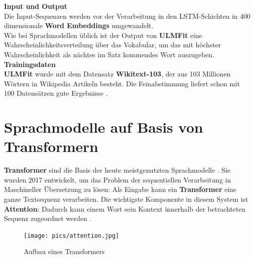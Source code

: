 \textbf{Input und Output}\\
Die Input-Sequenzen werden vor der Verarbeitung in den LSTM-Schichten in 400 dimensionale \textbf{Word Embeddings} umgewandelt.\\
Wie bei Sprachmodellen \"ublich ist der Output von \textbf{ULMFit} eine Wahrscheinlichkeitsverteilung \"uber das Vokabular, um das mit h\"ochster Wahrscheinlichkeit als n\"achtes im Satz kommendes Wort auszugeben.\\

\textbf{Trainingsdaten}\\
\textbf{ULMFit} wurde mit dem Datensatz \textbf{Wikitext-103}, der aus 103 Millionen W\"ortern in Wikipedia Artikeln besteht. Die Feinabstimmung liefert schon mit 100 Datens\"atzen gute Ergebnisse \cite{ulm}.



\section{Sprachmodelle auf Basis von Transformern}
\textbf{Transformer} sind die Basis der heute meistgenutzten Sprachmodelle \cite{bert}\cite{gpt}. Sie wurden 2017 entwickelt, um das Problem der sequentiellen Verarbeitung in Maschineller \"Ubersetzung zu l\"osen: Als Eingabe kann ein \textbf{Transformer} eine ganze Textsequenz verarbeiten. Die wichtigste Komponente in diesem System ist \textbf{Attention}: Dadurch kann einem Wort sein Kontext innerhalb der betrachteten Sequenz zugeordnet werden \cite{attention}.\\
\begin{figure}[!ht]
\centering
\texttt{[image: pics/attention.jpg]}
\caption{Aufbau eines Transformers \cite{attention}}
\label{fig:attention}
\end{figure}

